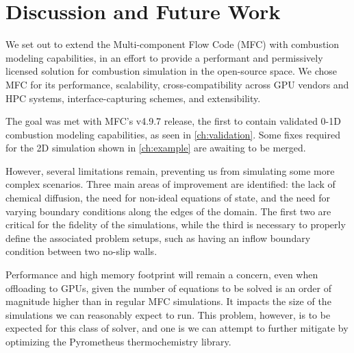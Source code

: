 \chapter{Discussion and Future Work}

We set out to extend the Multi-component Flow Code (MFC) with combustion modeling
capabilities, in an effort to provide a performant and permissively licensed solution
for combustion simulation in the open-source space.
We chose MFC for its performance, scalability, cross-compatibility across GPU
vendors and HPC systems, interface-capturing schemes, and extensibility.

The goal was met with MFC's v4.9.7 release, the first to contain validated 0-1D
combustion modeling capabilities, as seen in \autoref{ch:validation}. Some fixes
required for the 2D simulation shown in \autoref{ch:example} are awaiting to be
merged.

However, several limitations remain, preventing us from simulating some more
complex scenarios. Three main areas of improvement are identified: the lack of
chemical diffusion, the need for non-ideal equations of state, and the need for
varying boundary conditions along the edges of the domain. The first two are
critical for the fidelity of the simulations, while the third is necessary to
properly define the associated problem setups, such as having an inflow boundary
condition between two no-slip walls.

Performance and high memory footprint will remain a concern, even when offloading
to GPUs, given the number of equations to be solved is an order of magnitude higher
than in regular MFC simulations. It impacts the size of the simulations we can
reasonably expect to run. This problem, however, is to be expected for this class
of solver, and one is we can attempt to further mitigate by optimizing the
Pyrometheus \cite{Pyrometheus2024} thermochemistry library.